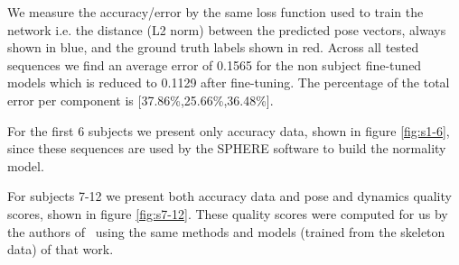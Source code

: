 \documentclass[11pt]{article} %
\begin{document}
We measure the accuracy/error by the same loss function used to train the network i.e. the distance (L2 norm) between the predicted pose vectors, always shown in blue, and the ground truth labels shown in red. Across all tested sequences we find an average error of 0.1565 for the non subject fine-tuned models which is reduced to 0.1129 after fine-tuning. The percentage of the total error per component is [37.86\%,25.66\%,36.48\%]. 


For the first 6 subjects we present only accuracy data, shown in figure \ref{fig:s1-6}, since these sequences are used by the SPHERE software to build the normality model.

For subjects 7-12 we present both accuracy data and pose and dynamics quality scores, shown in figure \ref{fig:s7-12}. These quality scores were computed for us by the authors of~\cite{Paiement} using the same methods and models (trained from the skeleton data) of that work. 
\end{document}
